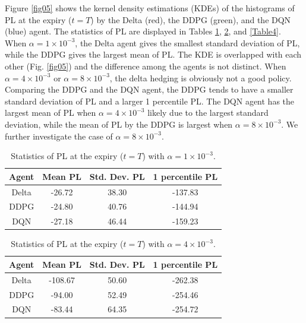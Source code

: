 \documentclass[11pt]{article}
\begin{document}
Figure \ref{fig05} shows the kernel density estimations (KDEs) of the histograms of PL at the expiry ($t=T$) by the Delta (red), the DDPG (green), and the DQN (blue) agent. The statistics of PL are displayed in Tables \ref{Table2}, \ref{Table3}, and \ref{Table4}. When $\alpha = 1 \times 10^{-3}$, the Delta agent gives the smallest standard deviation of PL, while the DDPG gives the largest mean of PL. The KDE is overlapped with each other (Fig. \ref{fig05}) and the difference among the agents is not distinct. When $\alpha = 4 \times 10^{-3}$ or $\alpha = 8 \times 10^{-3}$, the delta hedging is obviously not a good policy. Comparing the DDPG and the DQN agent, the DDPG tends to have a smaller standard deviation of PL and a larger 1 percentile PL. The DQN agent has the largest mean of PL when $\alpha = 4 \times 10^{-3}$ likely due to the largest standard deviation, while the mean of PL by the DDPG is largest when $\alpha = 8 \times 10^{-3}$. We further investigate the case of $\alpha = 8 \times 10^{-3}$.

\begin{table}[htb]
	\begin{center}
	\begin{tabular}{| c | c | c | c |} \hline
            Agent & Mean PL & Std. Dev. PL & 1 percentile PL \\ \hline\hline
            Delta & -26.72 & 38.30 & -137.83 \\  \hline
            DDPG & -24.80 & 40.76 & -144.94 \\  \hline
            DQN & -27.18 &  46.44 & -159.23 \\ \hline
        \end{tabular}
        \caption{Statistics of PL at the expiry ($t=T$) with $\alpha = 1 \times 10^{-3}$.}
        \label{Table2}
        \end{center}
\end{table}

\begin{table}[htb]
	\begin{center}
	\begin{tabular}{| c | c | c | c |} \hline
            Agent & Mean PL & Std. Dev. PL & 1 percentile PL \\ \hline\hline
            Delta & -108.67 & 50.60 & -262.38 \\  \hline
            DDPG & -94.00 & 52.49 & -254.46 \\  \hline
            DQN & -83.44 &  64.35 & -254.72 \\ \hline
        \end{tabular}
        \caption{Statistics of PL at the expiry ($t=T$) with $\alpha = 4 \times 10^{-3}$.}
        \label{Table3}
        \end{center}
\end{table}
\end{document}
